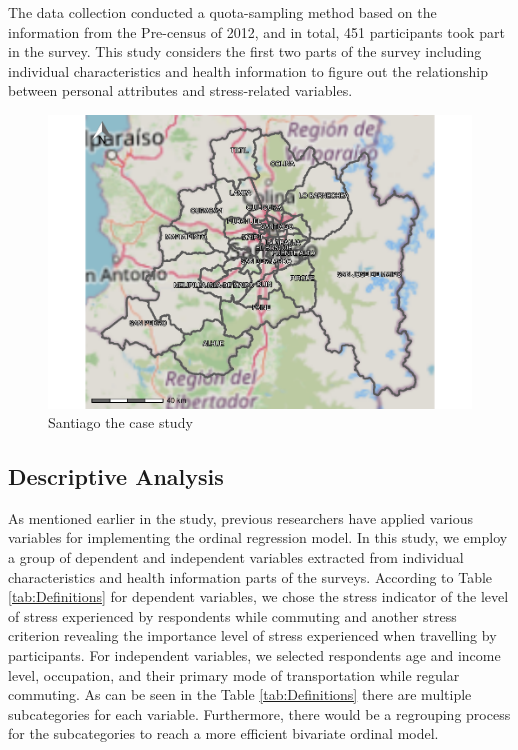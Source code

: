 \documentclass[
11pt, %
oneside, %
english, %
singlespacing, %
]{macthesis} %
\begin{document}
The data collection conducted a quota-sampling method based on the information from the Pre-census of 2012, and in total, 451 participants took part in the survey. This study considers the first two parts of the survey including individual characteristics and health information to figure out the relationship between personal attributes and stress-related variables.
\begin{figure}

{\centering \includegraphics[width=0.85\linewidth]{thesis_files/figure-latex/unnamed-chunk-20-1} 

}

\caption{\label{fig:study boundaries}Santiago the case study}\label{fig:unnamed-chunk-20}
\end{figure}
\hypertarget{descriptive-analysis}{%
\subsection{Descriptive Analysis}\label{descriptive-analysis}}

As mentioned earlier in the study, previous researchers have applied various variables for implementing the ordinal regression model. In this study, we employ a group of dependent and independent variables extracted from individual characteristics and health information parts of the surveys. According to Table \ref{tab:Definitions} for dependent variables, we chose the stress indicator of the level of stress experienced by respondents while commuting and another stress criterion revealing the importance level of stress experienced when travelling by participants. For independent variables, we selected respondents age and income level, occupation, and their primary mode of transportation while regular commuting. As can be seen in the Table \ref{tab:Definitions} there are multiple subcategories for each variable. Furthermore, there would be a regrouping process for the subcategories to reach a more efficient bivariate ordinal model.
\end{document}
